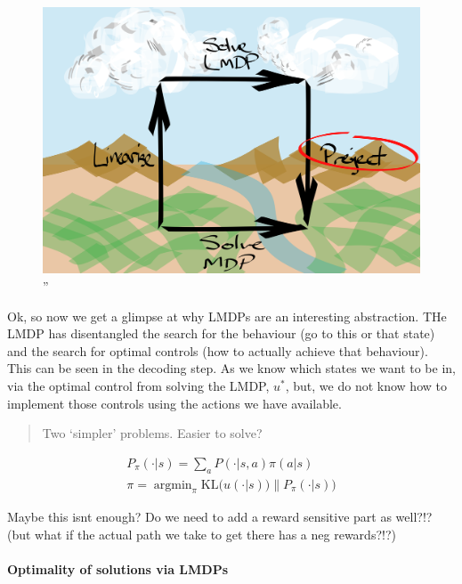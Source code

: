 \begin{figure}
\centering
\includegraphics[width=4.6875in,height=\textheight]{../../pictures/drawings/abstract-representations-project.png}
\caption{''}
\end{figure}

Ok, so now we get a glimpse at why LMDPs are an interesting abstraction.
THe LMDP has disentangled the search for the behaviour (go to this or
that state) and the search for optimal controls (how to actually achieve
that behaviour). This can be seen in the decoding step. As we know which
states we want to be in, via the optimal control from solving the LMDP,
\(u^{* }\), but, we do not know how to implement those controls using
the actions we have available.

\begin{quote}
Two `simpler' problems. Easier to solve?
\end{quote}

\begin{align}
P_{\pi}(\cdot | s) = \sum_a P(\cdot | s, a) \pi(a | s) \\
\pi = \mathop{\text{argmin}}_{\pi} \text{KL}\Big(u(\cdot | s))\parallel P_{\pi}(\cdot | s)\Big)
\end{align}

Maybe this isnt enough? Do we need to add a reward sensitive part as
well?!? (but what if the actual path we take to get there has a neg
rewards?!?)

\hypertarget{optimality-of-solutions-via-lmdps}{%
\paragraph{Optimality of solutions via
LMDPs}\label{optimality-of-solutions-via-lmdps}}

